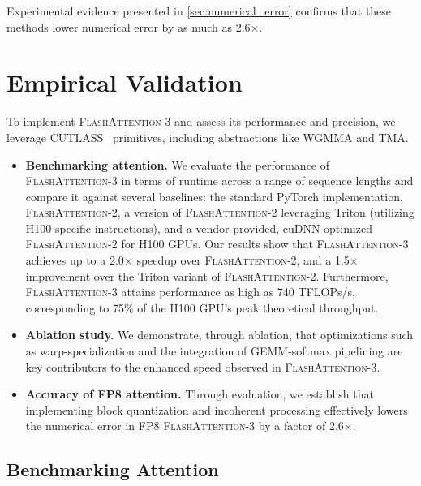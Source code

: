 \begin{enumerate}
\begin{enumerate}
\end{enumerate}

Experimental evidence presented in \cref{sec:numerical_error} confirms that these methods lower numerical error by as much as 2.6$\times$.

\section{Empirical Validation}
\label{sec:exp}

To implement \textsc{FlashAttention-3} and assess its performance and precision, we leverage CUTLASS~\citep{Thakkar_CUTLASS_2023} primitives, including abstractions like WGMMA and TMA.

\begin{itemize}

\item \textbf{Benchmarking attention.} We evaluate the performance of \textsc{FlashAttention-3} in terms of runtime across a range of sequence lengths and compare it against several baselines: the standard PyTorch implementation, \textsc{FlashAttention-2}, a version of \textsc{FlashAttention-2} leveraging Triton (utilizing H100-specific instructions), and a vendor-provided, cuDNN-optimized \textsc{FlashAttention-2} for H100 GPUs. Our results show that \textsc{FlashAttention-3} achieves up to a 2.0$\times$ speedup over \textsc{FlashAttention-2}, and a 1.5$\times$ improvement over the Triton variant of \textsc{FlashAttention-2}. Furthermore, \textsc{FlashAttention-3} attains performance as high as 740 TFLOPs/s, corresponding to 75\% of the H100 GPU’s peak theoretical throughput.
\item \textbf{Ablation study.} We demonstrate, through ablation, that optimizations such as warp-specialization and the integration of GEMM-softmax pipelining are key contributors to the enhanced speed observed in \textsc{FlashAttention-3}.
\item \textbf{Accuracy of FP8 attention.} Through evaluation, we establish that implementing block quantization and incoherent processing effectively lowers the numerical error in FP8 \textsc{FlashAttention-3} by a factor of 2.6$\times$.
\end{itemize}

\subsection{Benchmarking Attention}
\label{subsec:benchmark_attn}


\end{enumerate}

